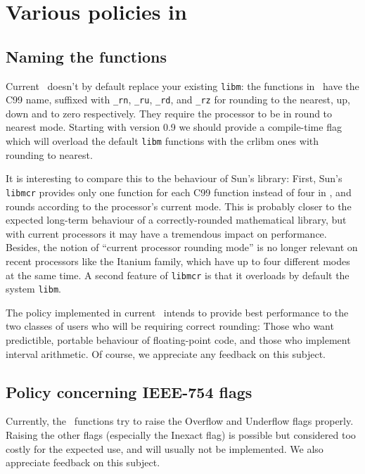 \section{Various policies in \crlibm}

\subsection{Naming the functions}
Current \crlibm\ doesn't by default replace your existing \texttt{libm}: the
functions in \crlibm\ have the C99 name, suffixed with \texttt{\_rn},
\texttt{\_ru}, \texttt{\_rd}, and \texttt{\_rz} for rounding to the
nearest, up, down and to zero respectively. They require the processor
to be in round to nearest mode. Starting with version 0.9 we should
provide a compile-time flag which will overload the default
\texttt{libm} functions with the crlibm ones with rounding to nearest.

It is interesting to compare this to the behaviour of Sun's library:
First, Sun's \texttt{libmcr} provides only one function for each C99
function instead of four in \crlibm, and rounds according to the
processor's current mode. This is probably closer to the expected
long-term behaviour of a correctly-rounded mathematical library, but
with current processors it may have a tremendous impact on
performance. Besides, the notion of ``current processor rounding
mode'' is no longer relevant on recent processors like the Itanium
family, which have up to four different modes at the same time.  A
second feature of \texttt{libmcr} is that it overloads by default the
system \texttt{libm}.

The policy implemented in current \crlibm\ intends to provide best
performance to the two classes of users who will be requiring correct
rounding: Those who want predictible, portable behaviour of
floating-point code, and those who implement interval arithmetic. Of course, we
appreciate any feedback on this subject.

\subsection{Policy concerning IEEE-754 flags}

Currently, the \crlibm\ functions try to raise the Overflow and
Underflow flags properly. Raising the other flags (especially the
Inexact flag) is possible but considered too costly for the expected
use, and will usually not be implemented. We also appreciate feedback
on this subject.

